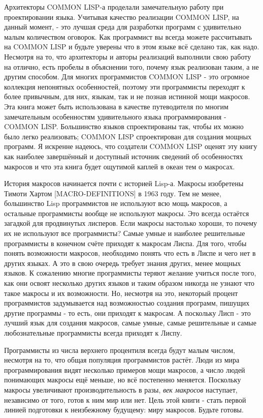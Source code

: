 Архитекторы COMMON LISP-а проделали замечательную работу при проектировании языка. Учитывая качество реализации COMMON LISP, на данный момент, - это лучшая среда для разработки программ с удивительно малым количеством оговорок. Как программист вы всегда можете рассчитывать на COMMON LISP и будьте уверены что в этом языке всё сделано так, как надо. Несмотря на то, что архитекторы и авторы реализаций выполнили свою работу на отлично, есть пробелы в объяснении того, почему язык реализован таким, а не другим способом. Для многих программистов COMMON LISP - это огромное коллекция непонятных особенностей, поэтому эти программисты переходят к более привычным, для них, языкам, так и не познав истинной мощи макросов. Эта книга может быть использована в качестве путеводителя по многим замечательным особенностям удивительного языка программирования - COMMON LISP. Большинство языков спроектированы так, чтобы их можно было легко реализовать; COMMON LISP спроектирован для создания мощных программ. Я искренне надеюсь, что создатели COMMON LISP оценят эту книгу как наиболее завершённый и доступный источник сведений об особенностях макросов и что эта книга будет ощутимой каплей в океан тем о макросах.

История макросов начинается почти с историей Lisp-а. Макросы изобретены Тимоти Хартом [MACRO-DEFINITIONS] в 1963 году. Тем не менее, большинство Lisp программистов не используют всю мощь макросов, а остальные программисты вообще не используют макросы. Это всегда остаётся загадкой для продвинутых лисперов. Если макросы настолько хороши, то почему их не используют все программисты? Самые умные и наиболее решительные программисты в конечном счёте приходят к макросам Лиспа. Для того, чтобы понять возможности макросов, необходимо понять что есть в Лиспе и чего нет в других языках. А это в свою очередь требует знания других, менее мощных языков. К сожалению многие программисты теряют желание учиться после того, как они освоят несколько других языков и таким образом никогда не узнают что такое макросы и их возможности. Но, несмотря на это, некоторый процент программистов задумывается над возможностью создания программ, пишущих другие программы - то есть, они приходят к макросам. А поскольку Лисп - это лучший язык для создания макросов, самые умные, самые решительные и самые любознательные программисты всегда приходят к Лиспу.

Программисты из числа верхнего процентиля всегда будут малым числом, несмотря на то, что общая популяция программистов растёт. Люди из мира программирования видят несколько примеров мощи макросов, а число людей понимающих макросы ещё меньше, но всё постепенно меняется. Поскольку макросы увеличивают производительность в разы, \emph{век макросов} наступает, независимо от того, готов к ним мир или нет. Цель этой книги - стать первой линией подготовки к неизбежному будущему: миру макросов. Будьте готовы.

